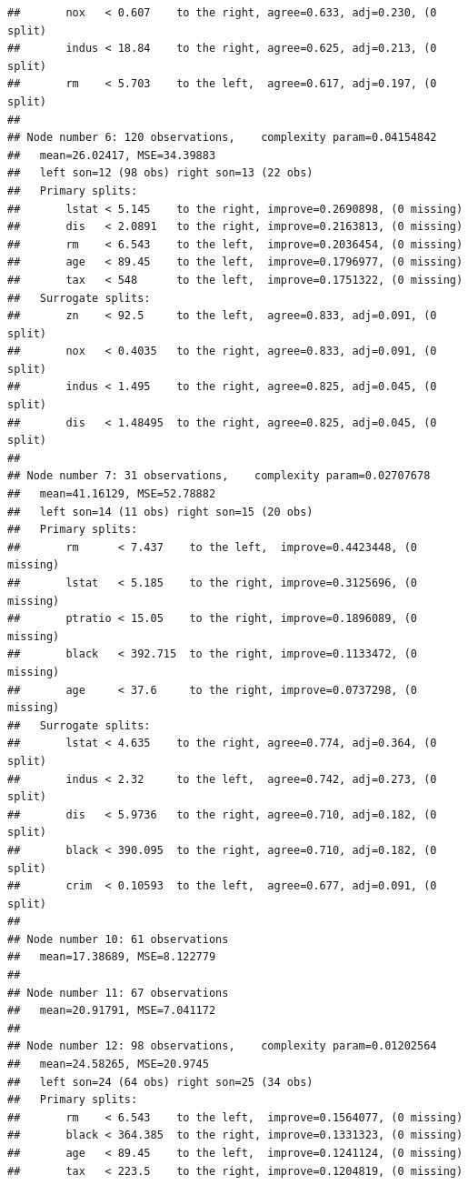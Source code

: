 \documentclass[]{book}
\theoremstyle{plain}
\theoremstyle{definition}
\theoremstyle{definition}
\theoremstyle{definition}
\theoremstyle{definition}
\theoremstyle{remark}
\begin{document}
\begin{verbatim}
##       nox   < 0.607    to the right, agree=0.633, adj=0.230, (0 split)
##       indus < 18.84    to the right, agree=0.625, adj=0.213, (0 split)
##       rm    < 5.703    to the left,  agree=0.617, adj=0.197, (0 split)
## 
## Node number 6: 120 observations,    complexity param=0.04154842
##   mean=26.02417, MSE=34.39883 
##   left son=12 (98 obs) right son=13 (22 obs)
##   Primary splits:
##       lstat < 5.145    to the right, improve=0.2690898, (0 missing)
##       dis   < 2.0891   to the right, improve=0.2163813, (0 missing)
##       rm    < 6.543    to the left,  improve=0.2036454, (0 missing)
##       age   < 89.45    to the left,  improve=0.1796977, (0 missing)
##       tax   < 548      to the left,  improve=0.1751322, (0 missing)
##   Surrogate splits:
##       zn    < 92.5     to the left,  agree=0.833, adj=0.091, (0 split)
##       nox   < 0.4035   to the right, agree=0.833, adj=0.091, (0 split)
##       indus < 1.495    to the right, agree=0.825, adj=0.045, (0 split)
##       dis   < 1.48495  to the right, agree=0.825, adj=0.045, (0 split)
## 
## Node number 7: 31 observations,    complexity param=0.02707678
##   mean=41.16129, MSE=52.78882 
##   left son=14 (11 obs) right son=15 (20 obs)
##   Primary splits:
##       rm      < 7.437    to the left,  improve=0.4423448, (0 missing)
##       lstat   < 5.185    to the right, improve=0.3125696, (0 missing)
##       ptratio < 15.05    to the right, improve=0.1896089, (0 missing)
##       black   < 392.715  to the right, improve=0.1133472, (0 missing)
##       age     < 37.6     to the right, improve=0.0737298, (0 missing)
##   Surrogate splits:
##       lstat < 4.635    to the right, agree=0.774, adj=0.364, (0 split)
##       indus < 2.32     to the left,  agree=0.742, adj=0.273, (0 split)
##       dis   < 5.9736   to the right, agree=0.710, adj=0.182, (0 split)
##       black < 390.095  to the right, agree=0.710, adj=0.182, (0 split)
##       crim  < 0.10593  to the left,  agree=0.677, adj=0.091, (0 split)
## 
## Node number 10: 61 observations
##   mean=17.38689, MSE=8.122779 
## 
## Node number 11: 67 observations
##   mean=20.91791, MSE=7.041172 
## 
## Node number 12: 98 observations,    complexity param=0.01202564
##   mean=24.58265, MSE=20.9745 
##   left son=24 (64 obs) right son=25 (34 obs)
##   Primary splits:
##       rm    < 6.543    to the left,  improve=0.1564077, (0 missing)
##       black < 364.385  to the right, improve=0.1331323, (0 missing)
##       age   < 89.45    to the left,  improve=0.1241124, (0 missing)
##       tax   < 223.5    to the right, improve=0.1204819, (0 missing)

\end{verbatim}
\end{document}
